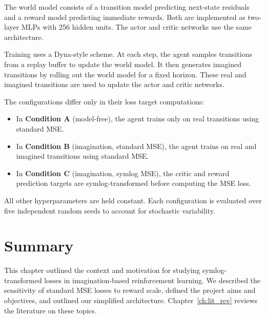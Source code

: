 The world model consists of a transition model predicting next-state residuals and a reward model predicting immediate rewards. Both are implemented as two-layer MLPs with 256 hidden units. The actor and critic networks use the same architecture.

Training uses a Dyna-style scheme. At each step, the agent samples transitions from a replay buffer to update the world model. It then generates imagined transitions by rolling out the world model for a fixed horizon. These real and imagined transitions are used to update the actor and critic networks.

The configurations differ only in their loss target computations:
\begin{itemize}
    \item In \textbf{Condition A} (model-free), the agent trains only on real transitions using standard MSE.
    \item In \textbf{Condition B} (imagination, standard MSE), the agent trains on real and imagined transitions using standard MSE.
    \item In \textbf{Condition C} (imagination, symlog MSE), the critic and reward prediction targets are symlog-transformed before computing the MSE loss.
\end{itemize}

\noindent All other hyperparameters are held constant. Each configuration is evaluated over five independent random seeds to account for stochastic variability.

\section{Summary}
\label{sec:intro_summary}

This chapter outlined the context and motivation for studying symlog-transformed losses in imagination-based reinforcement learning. We described the sensitivity of standard MSE losses to reward scale, defined the project aims and objectives, and outlined our simplified architecture. Chapter~\ref{ch:lit_rev} reviews the literature on these topics.